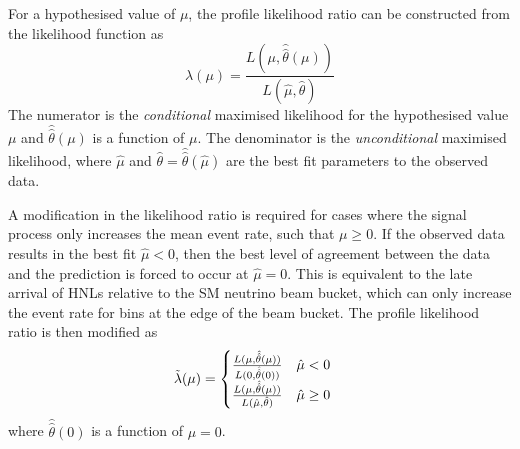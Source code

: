 For a hypothesised value of $\mu$, the profile likelihood ratio can be constructed from the likelihood function as \cite{asymptotic_test}
\begin{equation}
\label{eq:likelihood_ratio}
    \lambda(\mu) = \frac{L(\mu, \hat{\hat{\theta}}(\mu))}{L(\hat{\mu},\hat{\theta})}
\end{equation}
The numerator is the \textit{conditional} maximised likelihood for the hypothesised value $\mu$ and $\hat{\hat{\theta}}(\mu)$ is a function of $\mu$.
The denominator is the \textit{unconditional} maximised likelihood, where $\hat{\mu}$ and $\hat{\theta} = \hat{\hat{\theta}}(\hat{\mu})$ are the best fit parameters to the observed data.

A modification in the likelihood ratio is required for cases where the signal process only increases the mean event rate, such that $\mu \geq 0$.
If the observed data results in the best fit $\hat{\mu} < 0$, then the best level of agreement between the data and the prediction is forced to occur at $\hat{\mu} = 0$.
This is equivalent to the late arrival of HNLs relative to the SM neutrino beam bucket, which can only increase the event rate for bins at the edge of the beam bucket.
The profile likelihood ratio is then modified as \cite{asymptotic_test}
\begin{equation}
    \Tilde{\lambda}(\mu) =
    \begin{cases}
        \frac{L(\mu, \hat{\hat{\theta}}(\mu) )}{L(0, \hat{\hat{\theta}} (0))}\ \ \ \hat{\mu} < 0 \\
        \frac{L(\mu, \hat{\hat{\theta}}(\mu) )}{L(\hat{\mu}, \hat{\theta})}\ \ \ \hat{\mu} \geq 0 \\
    \end{cases}
\end{equation}
where $\hat{\hat{\theta}} (0)$ is a function of $\mu = 0$. 

